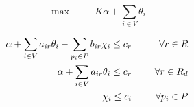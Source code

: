 \documentclass[12pt]{article}
\begin{document}
\[
\max \hspace{1cm} K \alpha + \sum\limits_{i \in V}{\theta_i}
\]

\begin{small}
\begin{eqnarray}
\label{eqC01}
  \alpha + \sum\limits_{i \in V}{a_{ir} \theta_i} - \sum\limits_{p_i \in P}{b_{ir} \chi_i} \le c_r & \hspace{5mm} & \forall r \in R \\
\label{eqC01}
  \alpha + \sum\limits_{i \in V}{a_{ir} \theta_i} \le c_r & \hspace{5mm} & \forall r \in R_d \\
\label{eqC02}
  \chi_i \le c_i & \hspace{5mm} & \forall p_i \in P
\end{eqnarray}
\end{small}
\end{document}

